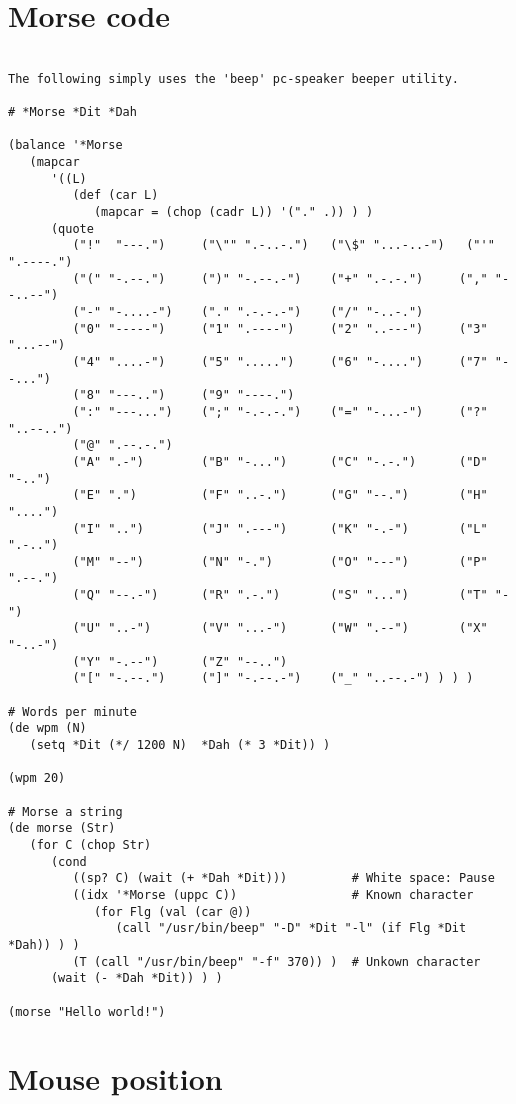\section*{Morse code}

\begin{verbatim}

The following simply uses the 'beep' pc-speaker beeper utility.

# *Morse *Dit *Dah

(balance '*Morse
   (mapcar
      '((L)
         (def (car L)
            (mapcar = (chop (cadr L)) '("." .)) ) )
      (quote
         ("!"  "---.")     ("\"" ".-..-.")   ("\$" "...-..-")   ("'" ".----.")
         ("(" "-.--.")     (")" "-.--.-")    ("+" ".-.-.")     ("," "--..--")
         ("-" "-....-")    ("." ".-.-.-")    ("/" "-..-.")
         ("0" "-----")     ("1" ".----")     ("2" "..---")     ("3" "...--")
         ("4" "....-")     ("5" ".....")     ("6" "-....")     ("7" "--...")
         ("8" "---..")     ("9" "----.")
         (":" "---...")    (";" "-.-.-.")    ("=" "-...-")     ("?" "..--..")
         ("@" ".--.-.")
         ("A" ".-")        ("B" "-...")      ("C" "-.-.")      ("D" "-..")
         ("E" ".")         ("F" "..-.")      ("G" "--.")       ("H" "....")
         ("I" "..")        ("J" ".---")      ("K" "-.-")       ("L" ".-..")
         ("M" "--")        ("N" "-.")        ("O" "---")       ("P" ".--.")
         ("Q" "--.-")      ("R" ".-.")       ("S" "...")       ("T" "-")
         ("U" "..-")       ("V" "...-")      ("W" ".--")       ("X" "-..-")
         ("Y" "-.--")      ("Z" "--..")
         ("[" "-.--.")     ("]" "-.--.-")    ("_" "..--.-") ) ) )

# Words per minute
(de wpm (N)
   (setq *Dit (*/ 1200 N)  *Dah (* 3 *Dit)) )

(wpm 20)

# Morse a string
(de morse (Str)
   (for C (chop Str)
      (cond
         ((sp? C) (wait (+ *Dah *Dit)))         # White space: Pause
         ((idx '*Morse (uppc C))                # Known character
            (for Flg (val (car @))
               (call "/usr/bin/beep" "-D" *Dit "-l" (if Flg *Dit *Dah)) ) )
         (T (call "/usr/bin/beep" "-f" 370)) )  # Unkown character
      (wait (- *Dah *Dit)) ) )

(morse "Hello world!")

\end{verbatim}

\section*{Mouse position}

